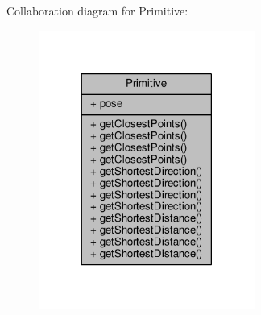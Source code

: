 Collaboration diagram for Primitive\+:
\nopagebreak
\begin{figure}[H]
\begin{center}
\leavevmode
\includegraphics[width=201pt]{class_primitive__coll__graph}
\end{center}
\end{figure}
